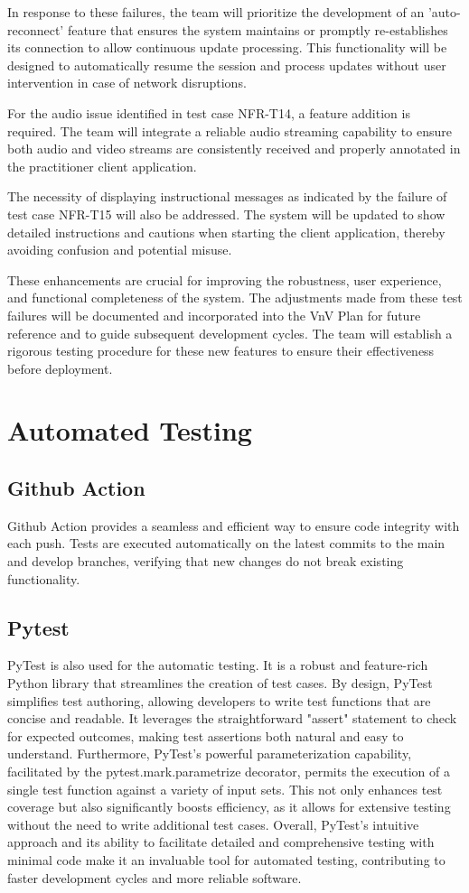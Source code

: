 \documentclass[12pt, titlepage]{article}
\begin{document}
In response to these failures, the team will prioritize the development of an 'auto-reconnect' feature that ensures the system maintains or promptly re-establishes its connection to allow continuous update processing. This functionality will be designed to automatically resume the session and process updates without user intervention in case of network disruptions.

For the audio issue identified in test case NFR-T14, a feature addition is required. The team will integrate a reliable audio streaming capability to ensure both audio and video streams are consistently received and properly annotated in the practitioner client application.

The necessity of displaying instructional messages as indicated by the failure of test case NFR-T15 will also be addressed. The system will be updated to show detailed instructions and cautions when starting the client application, thereby avoiding confusion and potential misuse.

These enhancements are crucial for improving the robustness, user experience, and functional completeness of the system. The adjustments made from these test failures will be documented and incorporated into the VnV Plan for future reference and to guide subsequent development cycles. The team will establish a rigorous testing procedure for these new features to ensure their effectiveness before deployment.

\section{Automated Testing}
\subsection{Github Action}
Github Action provides a seamless and efficient way to ensure code integrity with each push. 
Tests are executed automatically on the latest commits to the main and develop branches, verifying that new changes do not break existing functionality. 
\subsection{Pytest}
PyTest is also used for the automatic testing. It is a robust and feature-rich Python library that streamlines the creation of test cases. 
By design, PyTest simplifies test authoring, allowing developers to write test functions that are concise and readable. 
It leverages the straightforward "assert" statement to check for expected outcomes, making test assertions both natural and easy to understand. 
Furthermore, PyTest's powerful parameterization capability, facilitated by the pytest.mark.parametrize decorator, permits the execution of a single test function against a variety of input sets. 
This not only enhances test coverage but also significantly boosts efficiency, as it allows for extensive testing without the need to write additional test cases.
 Overall, PyTest's intuitive approach and its ability to facilitate detailed and comprehensive testing with minimal code make it an invaluable tool for automated testing, contributing to faster development cycles and more reliable software.
\end{document}
